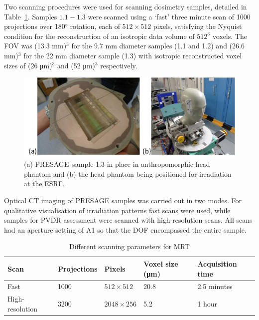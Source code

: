 	Two scanning procedures were used for scanning dosimetry samples, detailed in Table~\ref{table:scansettings}. Samples $1.1−1.3$ were scanned using a `fast' three minute scan of 1000 projections over \ang{180} rotation, each of $512 \times 512$ pixels, satisfying the Nyquist condition for the reconstruction of an isotropic data volume of $512^3$ voxels. The FOV was (13.3 mm)$^3$ for the 9.7 mm diameter samples (1.1 and 1.2) and (26.6 mm)$^3$ for the 22 mm diameter sample (1.3) with isotropic reconstructed voxel sizes of (26 \si{\um})$^3$ and (52 \si{\um})$^3$ respectively.
	
	\begin{figure}
		\centering
		\includegraphics[width=0.9\linewidth]{mrt_img/mrt_Fig1}
		\caption{(a) PRESAGE\textregistered \ sample 1.3 in place in anthropomorphic head phantom and (b) the head phantom being positioned for irradiation at the ESRF.}
		\label{fig:Fig1christopher}
	\end{figure}
	

	
	
	Optical CT imaging of PRESAGE samples was carried out in two modes.
	For qualitative visualisation of irradiation patterns fast scans were used, while samples for PVDR assessment were scanned with high-resolution scans. All scans had an aperture setting of A1 so that the DOF encompassed the entire sample.
	
	
	
	\begin{table}[H]
		\centering
		\begin{tabular}{ p{2.3cm}  p{2.5cm} p{2.5cm}  p{2.3cm} p{2.5cm}  }
			\hline
			\textbf{Scan} & \textbf{Projections} &\textbf{Pixels}   &\textbf{Voxel size (\si{\um})} & \textbf{Acquisition time} \\ \hline 
			Fast  & 1000 & $512\times 512$  & 20.8 & 2.5 minutes \\ %
			High-resolution & 3200 & $2048\times 256$ &  5.2 & 1 hour \\ 
			\hline
		\end{tabular}
		\caption{Different scanning parameters for MRT}
		\label{table:scansettings}
	\end{table}
	

